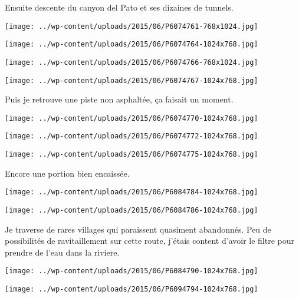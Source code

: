 \pagebreak
Ensuite descente du canyon del Pato et ses dizaines de tunnels. 
\begin{center} \texttt{[image: ../wp-content/uploads/2015/06/P6074761-768x1024.jpg]} \end{center}
\begin{center} \texttt{[image: ../wp-content/uploads/2015/06/P6074764-1024x768.jpg]} \end{center}
\begin{center} \texttt{[image: ../wp-content/uploads/2015/06/P6074766-768x1024.jpg]} \end{center}
\begin{center} \texttt{[image: ../wp-content/uploads/2015/06/P6074767-1024x768.jpg]} \end{center}

\pagebreak
Puis je retrouve une piste non asphaltée, ça faisait un moment. 
\begin{center} \texttt{[image: ../wp-content/uploads/2015/06/P6074770-1024x768.jpg]} \end{center}
\begin{center} \texttt{[image: ../wp-content/uploads/2015/06/P6074772-1024x768.jpg]} \end{center}
\begin{center} \texttt{[image: ../wp-content/uploads/2015/06/P6074775-1024x768.jpg]} \end{center}

Encore une portion bien encaissée. 
\begin{center} \texttt{[image: ../wp-content/uploads/2015/06/P6084784-1024x768.jpg]} \end{center}
\begin{center} \texttt{[image: ../wp-content/uploads/2015/06/P6084786-1024x768.jpg]} \end{center}

Je traverse de rares villages qui paraissent quasiment abandonnés. Peu de possibilités de ravitaillement sur cette route, j'étais content d'avoir le filtre pour prendre de l'eau dans la riviere. 
\begin{center} \texttt{[image: ../wp-content/uploads/2015/06/P6084790-1024x768.jpg]} \end{center}
\begin{center} \texttt{[image: ../wp-content/uploads/2015/06/P6094794-1024x768.jpg]} \end{center}

